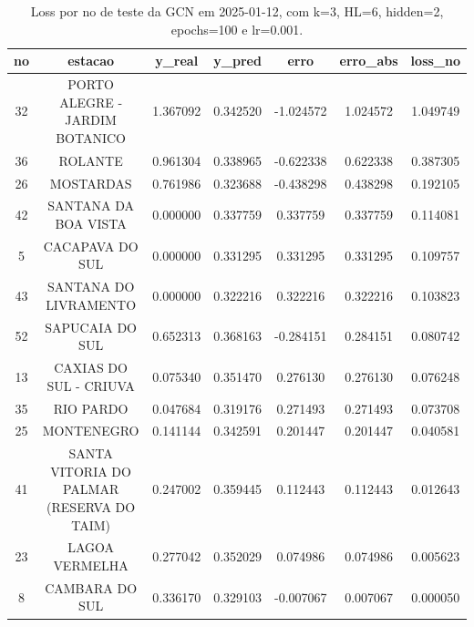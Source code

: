 \begin{table}[h]
\centering
\caption{Loss por no de teste da GCN em 2025-01-12, com k=3, HL=6, hidden=2, epochs=100 e lr=0.001.}
\label{tab:gcn_loss_k3_hl6_h2_e100_d20250112}
\begin{tabular}{ccccccc}
\toprule
no & estacao & y\_real & y\_pred & erro & erro\_abs & loss\_no \\
\midrule
32 & PORTO ALEGRE - JARDIM BOTANICO & 1.367092 & 0.342520 & -1.024572 & 1.024572 & 1.049749 \\
36 & ROLANTE & 0.961304 & 0.338965 & -0.622338 & 0.622338 & 0.387305 \\
26 & MOSTARDAS & 0.761986 & 0.323688 & -0.438298 & 0.438298 & 0.192105 \\
42 & SANTANA DA BOA VISTA & 0.000000 & 0.337759 & 0.337759 & 0.337759 & 0.114081 \\
5 & CACAPAVA DO SUL & 0.000000 & 0.331295 & 0.331295 & 0.331295 & 0.109757 \\
43 & SANTANA DO LIVRAMENTO & 0.000000 & 0.322216 & 0.322216 & 0.322216 & 0.103823 \\
52 & SAPUCAIA DO SUL & 0.652313 & 0.368163 & -0.284151 & 0.284151 & 0.080742 \\
13 & CAXIAS DO SUL - CRIUVA & 0.075340 & 0.351470 & 0.276130 & 0.276130 & 0.076248 \\
35 & RIO PARDO & 0.047684 & 0.319176 & 0.271493 & 0.271493 & 0.073708 \\
25 & MONTENEGRO & 0.141144 & 0.342591 & 0.201447 & 0.201447 & 0.040581 \\
41 & SANTA VITORIA DO PALMAR (RESERVA DO TAIM) & 0.247002 & 0.359445 & 0.112443 & 0.112443 & 0.012643 \\
23 & LAGOA VERMELHA & 0.277042 & 0.352029 & 0.074986 & 0.074986 & 0.005623 \\
8 & CAMBARA DO SUL & 0.336170 & 0.329103 & -0.007067 & 0.007067 & 0.000050 \\
\bottomrule
\end{tabular}
\end{table}
